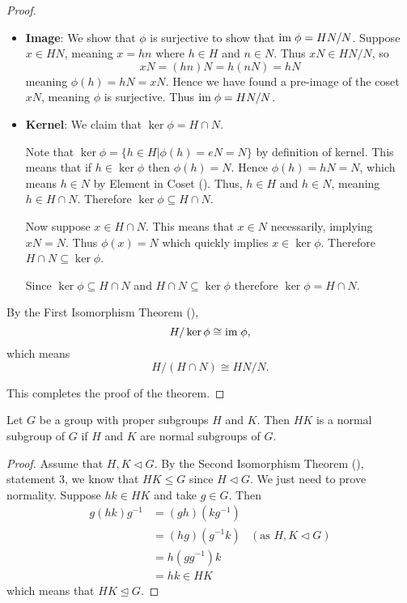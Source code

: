 \begin{proof}
\begin{enumerate}
\begin{itemize}
            \item \textbf{Image}: We show that $\phi$ is surjective to show that $\mathrm{im}\;\phi = HN/N$. Suppose $x \in HN$, meaning $x = hn$ where $h \in H$ and $n \in N$. Thus $xN \in HN/N$, so
            \[
                xN = (hn)N = h(nN) = hN
            \]
            meaning $\phi(h) = hN = xN$. Hence we have found a pre-image of the coset $xN$, meaning $\phi$ is surjective. Thus $\mathrm{im}\; \phi = HN/N$.

            \item \textbf{Kernel}: We claim that $\ker\phi = H \cap N$.

            Note that $\ker\phi = \{h \in H \vert \phi(h) = eN = N\}$ by definition of kernel. This means that if $h \in \ker\phi$ then $\phi(h) = N$. Hence $\phi(h) = hN = N$, which means $h \in N$ by Element in Coset (). Thus, $h \in H$ and $h \in N$, meaning $h \in H \cap N$. Therefore $\ker \phi \subseteq H \cap N$.

            Now suppose $x \in H \cap N$. This means that $x \in N$ necessarily, implying $xN = N$. Thus $\phi(x) = N$ which quickly implies $x \in \ker\phi$. Therefore $H \cap N \subseteq \ker\phi$.

            Since $\ker \phi \subseteq H \cap N$ and  $H \cap N \subseteq \ker\phi$ therefore $\ker\phi = H\cap N$.
        \end{itemize}

        By the First Isomorphism Theorem (),
        \[
            H / \ker\phi \cong \mathrm{im}\; \phi,
        \]
        which means
        \[
            H/(H\cap N) \cong HN/N.
        \]
    \end{enumerate}
    This completes the proof of the theorem.
\end{proof}

\begin{corollary}\label{corollary-subgroup-product-is-normal-subgroup-if-subgroups-are-normal}
    Let $G$ be a group with proper subgroups $H$ and $K$. Then $HK$ is a normal subgroup of $G$ if $H$ and $K$ are normal subgroups of $G$.
\end{corollary}
\begin{proof}
    Assume that $H, K \lhd G$. By the Second Isomorphism Theorem (), statement 3, we know that $HK \leq G$ since $H \lhd G$. We just need to prove normality. Suppose $hk \in HK$ and take $g \in G$. Then
    \begin{align*}
        g(hk)g^{-1} &= (gh)(kg^{-1})\\
        &= (hg)(g^{-1}k) & (\text{as } H, K \lhd G)\\
        &= h(gg^{-1})k\\
        &= hk \in HK
    \end{align*}
    which means that $HK \unlhd G$.
\end{proof}

